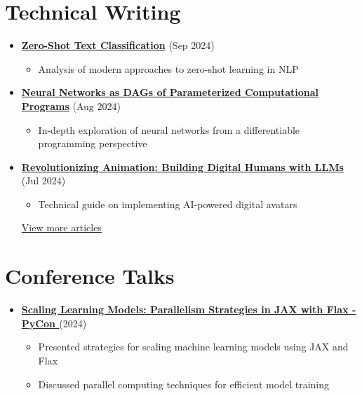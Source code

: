 \documentclass[letterpaper,11pt]{article}
\begin{document}
\section{Technical Writing}
\begin{itemize}[leftmargin=*]

    \item \textbf{\href{https://www.asanchezyali.com/blog/en/ai/20240917ZeroShot}{Zero-Shot Text Classification}} (Sep 2024)
    \begin{itemize}
        \item Analysis of modern approaches to zero-shot learning in NLP
    \end{itemize} 
    
    \item \textbf{\href{https://www.asanchezyali.com/blog/en/differentiable-programming/20240923DifferentiablePrograms}{Neural Networks as DAGs of Parameterized Computational Programs}} (Aug 2024)
    \begin{itemize}
        \item In-depth exploration of neural networks from a differentiable programming perspective
    \end{itemize}
    

    
    \item \textbf{\href{https://www.asanchezyali.com/blog/en/ai-avatars/20240703DigitalHuman}{Revolutionizing Animation: Building Digital Humans with LLMs}} (Jul 2024)
    \begin{itemize}
        \item Technical guide on implementing AI-powered digital avatars
    \end{itemize}
    
    \href{https://www.asanchezyali.com/}{View more articles \faExternalLink}
\end{itemize}

\section{Conference Talks}
\begin{itemize}[leftmargin=*]
    \item \textbf{\href{https://www.youtube.com/watch?v=m4hP1soE414}{Scaling Learning Models: Parallelism Strategies in JAX with Flax - PyCon \faYoutube}} (2024)
    \begin{itemize}
        \item Presented strategies for scaling machine learning models using JAX and Flax
        \item Discussed parallel computing techniques for efficient model training
    \end{itemize}
\end{itemize}
\end{document}
